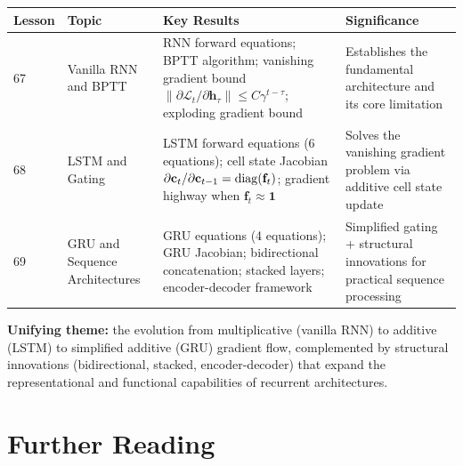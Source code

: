 \documentclass[11pt,a4paper]{article}
\begin{document}
\begin{center}
\small
\begin{tabular}{p{1.5cm}p{3.5cm}p{5cm}p{3cm}}
\toprule
\textbf{Lesson} & \textbf{Topic} & \textbf{Key Results}
  & \textbf{Significance} \\
\midrule
67 & Vanilla RNN and BPTT
  & RNN forward equations; BPTT algorithm; vanishing gradient
    bound $\|\partial \mathcal{L}_t/\partial \mathbf{h}_\tau\|
    \leq C\gamma^{t-\tau}$; exploding gradient bound
  & Establishes the fundamental architecture and its core
    limitation \\[6pt]
68 & LSTM and Gating
  & LSTM forward equations (6 equations); cell state Jacobian
    $\partial \mathbf{c}_t/\partial \mathbf{c}_{t-1} =
    \operatorname{diag}(\mathbf{f}_t)$; gradient highway when
    $\mathbf{f}_t \approx \mathbf{1}$
  & Solves the vanishing gradient problem via additive cell
    state update \\[6pt]
69 & GRU and Sequence Architectures
  & GRU equations (4 equations); GRU Jacobian; bidirectional
    concatenation; stacked layers; encoder-decoder framework
  & Simplified gating + structural innovations for practical
    sequence processing \\
\bottomrule
\end{tabular}
\end{center}

\textbf{Unifying theme:} the evolution from multiplicative
(vanilla RNN) to additive (LSTM) to simplified additive (GRU)
gradient flow, complemented by structural innovations
(bidirectional, stacked, encoder-decoder) that expand the
representational and functional capabilities of recurrent
architectures.

\section{Further Reading}
\label{sec:further-reading}
\end{document}
